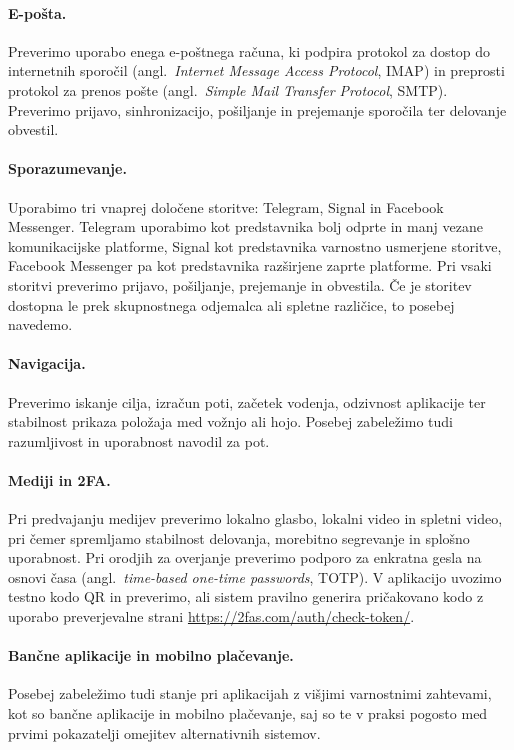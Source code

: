 \documentclass[a4paper,12pt,openright]{book}
\begin{document}
\paragraph{E-pošta.}
Preverimo uporabo enega e-poštnega računa, ki podpira protokol za dostop do internetnih sporočil (angl.~\textit{Internet Message Access Protocol}, IMAP) in preprosti protokol za prenos pošte (angl.~\textit{Simple Mail Transfer Protocol}, SMTP).
Preverimo prijavo, sinhronizacijo, pošiljanje in prejemanje sporočila ter delovanje obvestil.

\paragraph{Sporazumevanje.}
Uporabimo tri vnaprej določene storitve: Telegram, Signal in Facebook Messenger.
Telegram uporabimo kot predstavnika bolj odprte in manj vezane komunikacijske platforme, Signal kot predstavnika varnostno usmerjene storitve, Facebook Messenger pa kot predstavnika razširjene zaprte platforme.
Pri vsaki storitvi preverimo prijavo, pošiljanje, prejemanje in obvestila.
Če je storitev dostopna le prek skupnostnega odjemalca ali spletne različice, to posebej navedemo.

\paragraph{Navigacija.}
Preverimo iskanje cilja, izračun poti, začetek vodenja, odzivnost aplikacije ter stabilnost prikaza položaja med vožnjo ali hojo.
Posebej zabeležimo tudi razumljivost in uporabnost navodil za pot.

\paragraph{Mediji in 2FA.}
Pri predvajanju medijev preverimo lokalno glasbo, lokalni video in spletni video, pri čemer spremljamo stabilnost delovanja, morebitno segrevanje in splošno uporabnost.
Pri orodjih za overjanje preverimo podporo za enkratna gesla na osnovi časa (angl.~\textit{time-based one-time passwords}, TOTP). V aplikacijo uvozimo testno kodo QR in preverimo, ali sistem pravilno generira pričakovano kodo z uporabo preverjevalne strani \url{https://2fas.com/auth/check-token/}.

\paragraph{Bančne aplikacije in mobilno plačevanje.}
Posebej zabeležimo tudi stanje pri aplikacijah z višjimi varnostnimi zahtevami, kot so bančne aplikacije in mobilno plačevanje, saj so te v praksi pogosto med prvimi pokazatelji omejitev alternativnih sistemov.
\end{document}
